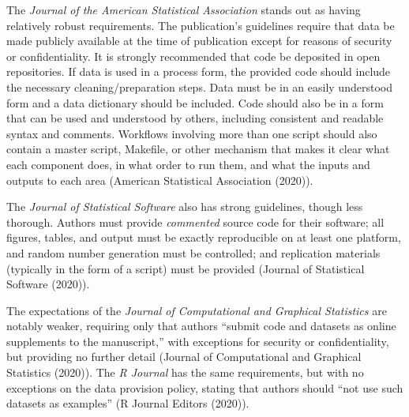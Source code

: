 \documentclass[12pt,twoside]{reedthesis}
\begin{document}
The \emph{Journal of the American Statistical Association} stands out as having relatively robust requirements. The publication's guidelines require that data be made publicly available at the time of publication except for reasons of security or confidentiality. It is strongly recommended that code be deposited in open repositories. If data is used in a process form, the provided code should include the necessary cleaning/preparation steps. Data must be in an easily understood form and a data dictionary should be included. Code should also be in a form that can be used and understood by others, including consistent and readable syntax and comments. Workflows involving more than one script should also contain a master script, Makefile, or other mechanism that makes it clear what each component does, in what order to run them, and what the inputs and outputs to each area (American Statistical Association (2020)).

The \emph{Journal of Statistical Software} also has strong guidelines, though less thorough. Authors must provide \emph{commented} source code for their software; all figures, tables, and output must be exactly reproducible on at least one platform, and random number generation must be controlled; and replication materials (typically in the form of a script) must be provided (Journal of Statistical Software (2020)).

The expectations of the \emph{Journal of Computational and Graphical Statistics} are notably weaker, requiring only that authors ``submit code and datasets as online supplements to the manuscript,'' with exceptions for security or confidentiality, but providing no further detail (Journal of Computational and Graphical Statistics (2020)). The \emph{R Journal} has the same requirements, but with no exceptions on the data provision policy, stating that authors should ``not use such datasets as examples'' (R Journal Editors (2020)).
\end{document}
